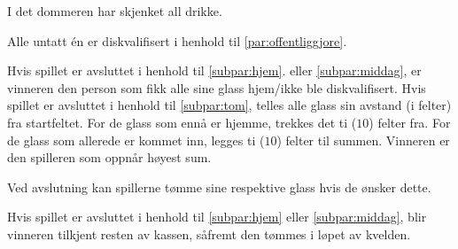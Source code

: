 \begin{ludol}
\begin{ludol}
  \item \label{subpar:tom} I det dommeren har skjenket all drikke.

  \item \label{subpar:middag} Alle untatt én er diskvalifisert i henhold til
    \cref{par:offentliggjore}.

  \end{ludol}

\item Hvis spillet er avsluttet i henhold til \cref{subpar:hjem}. eller
  \cref{subpar:middag}, er vinneren den person som fikk alle sine glass
  hjem/ikke ble diskvalifisert. Hvis spillet er avsluttet i henhold til
  \cref{subpar:tom}, telles alle glass sin avstand (i felter) fra startfeltet.
  For de glass som ennå er hjemme, trekkes det ti ($10$) felter fra. For de
  glass som allerede er kommet inn, legges ti ($10$) felter til summen. Vinneren
  er den spilleren som oppnår høyest sum.

\item Ved avslutning kan spillerne tømme sine respektive glass hvis de ønsker
  dette.

\item Hvis spillet er avsluttet i henhold til \cref{subpar:hjem} eller
  \ref{subpar:middag}, blir vinneren tilkjent resten av kassen, såfremt den
  tømmes i løpet av kvelden.

\end{ludol}